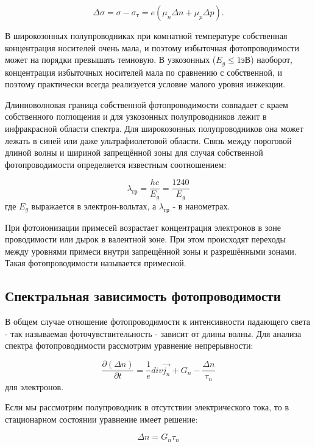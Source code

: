 \begin{equation}
\Delta \sigma = \sigma - \sigma_{\text{т}} = e (\mu_{n} \Delta n + \mu_{p} \Delta p).
\end{equation}

В широкозонных полупроводниках при комнатной температуре собственная концентрация носителей очень мала, и поэтому избыточная фотопроводимости может на порядки превышать темновую. В узкозонных ($E_{g} \le 1 \text{эВ}$) наоборот, концентрация избыточных носителей мала по сравнению с собственной, и поэтому практически всегда реализуется условие малого уровня инжекции.

Длинноволновая граница собственной фотопроводимости совпадает с краем собственного поглощения и для узкозонных полупроводников лежит в инфракрасной области спектра. Для широкозонных полупроводников она может лежать в синей или даже ультрафиолетовой области. Связь между пороговой длиной волны и шириной запрещённой зоны для случая собственной фотопроводимости определяется известным соотношением:

\begin{equation}
\lambda_{\text{гр}} = \frac{h c}{E_{g}} = \frac{1240}{E_{g}}
\end{equation}
где $E_{g}$ выражается в электрон-вольтах, а $\lambda_{\text{гр}}$ - в нанометрах.

При фотоионизации примесей возрастает концентрация электронов в зоне проводимости или дырок в валентной зоне. При этом происходят переходы между уровнями примеси внутри запрещённой зоны и разрешёнными зонами. Такая фотопроводимости называется примесной.

\subsection{Спектральная зависимость фотопроводимости}
В общем случае отношение фотопроводимости к интенсивности падающего света - так называемая фоточувствительность - зависит от длины волны. Для анализа спектра фотопроводимости рассмотрим уравнение непрерывности:

\begin{equation}
\frac{\partial (\Delta n)}{\partial t} = \frac{1}{e} div \overrightarrow{j_{n}} + G_{n} - \frac{\Delta n}{\tau_{n}}
\end{equation}
для электронов.

Если мы рассмотрим полупроводник в отсутствии электрического тока, то в стационарном состоянии уравнение имеет решение:

\begin{equation}
\Delta n = G_{n} \tau_{n}
\end{equation}

